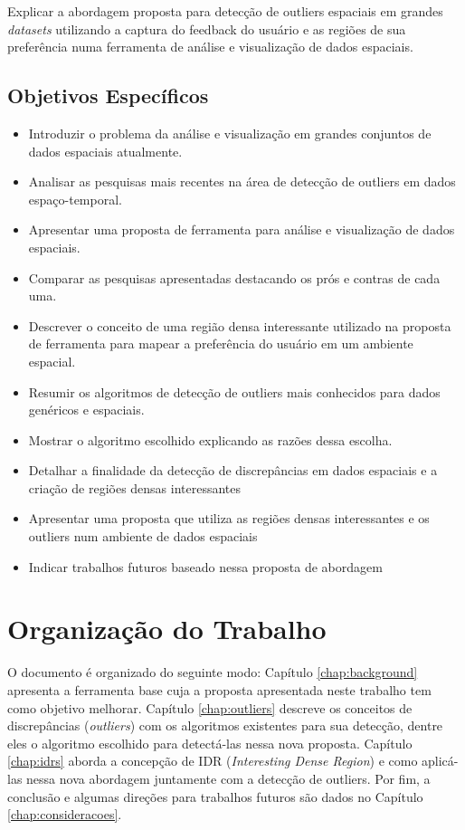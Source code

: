 Explicar a abordagem proposta para detecção de outliers espaciais em grandes \textit{datasets} utilizando a captura do feedback do usuário e as regiões de sua preferência numa ferramenta de análise e visualização de dados espaciais.

\subsection{Objetivos Específicos}

\begin{itemize}
	\item
		Introduzir o problema da análise e visualização em grandes conjuntos de dados espaciais atualmente.
	\item
	      Analisar as pesquisas mais recentes na área de detecção de outliers em dados espaço-temporal.
	\item
	      Apresentar uma proposta de ferramenta para análise e visualização de dados espaciais.
	\item
	      Comparar as pesquisas apresentadas destacando os prós e contras de cada uma.
	\item
	      Descrever o conceito de uma região densa interessante utilizado na proposta de ferramenta para mapear a preferência do usuário em um ambiente espacial.
	\item
	      Resumir os algoritmos de detecção de outliers mais conhecidos para dados genéricos e espaciais.
	\item
	      Mostrar o algoritmo escolhido explicando as razões dessa escolha.
	\item 
		Detalhar a finalidade da detecção de discrepâncias em dados espaciais e a criação de regiões densas interessantes
	\item
		Apresentar uma proposta que utiliza as regiões densas interessantes e os outliers num ambiente de dados espaciais
	\item
		Indicar trabalhos futuros baseado nessa proposta de abordagem

\end{itemize}

\section{Organização do Trabalho}


O documento é organizado do seguinte modo: Capítulo \ref{chap:background} apresenta a ferramenta base cuja a proposta apresentada neste trabalho tem como objetivo melhorar. Capítulo \ref{chap:outliers} descreve os conceitos de discrepâncias (\textit{outliers}) com os algoritmos existentes para sua detecção, dentre eles o algoritmo escolhido para detectá-las nessa nova proposta. Capítulo \ref{chap:idrs} aborda a concepção de IDR (\textit{Interesting Dense Region}) e como aplicá-las nessa nova abordagem juntamente com a detecção de outliers. Por fim, a conclusão e algumas direções para trabalhos futuros são dados no Capítulo \ref{chap:consideracoes}.